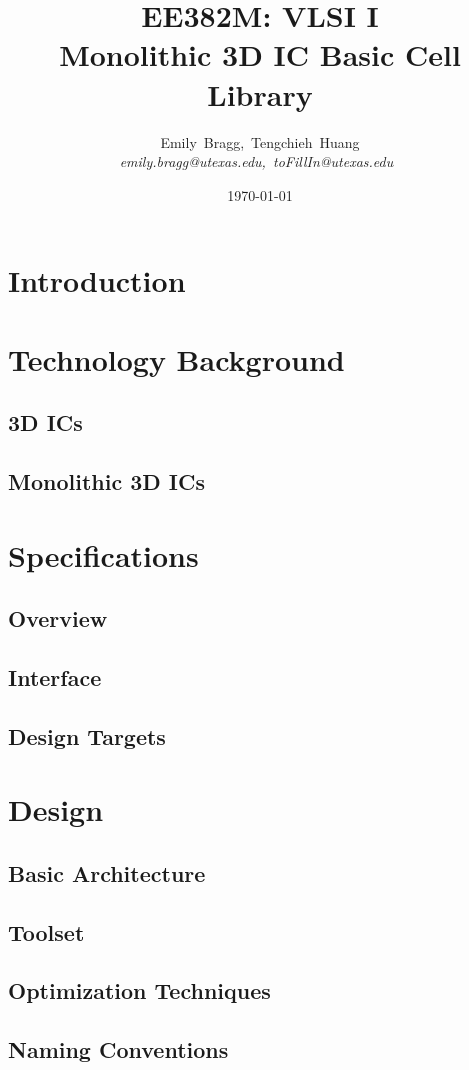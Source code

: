 \documentclass{article}
\title{EE382M: VLSI I \\ Monolithic 3D IC Basic Cell Library}
\author {
	Emily~Bragg,~Tengchieh~Huang\\
       	\em emily.bragg@utexas.edu,~toFillIn@utexas.edu\
}
\date{\today}
\begin{document}
\maketitle


\newpage
\section{Introduction}

\section{Technology Background}
\subsection{3D ICs}
\subsection{Monolithic 3D ICs}

\section{Specifications}
\subsection{Overview}
\subsection{Interface}
\subsection{Design Targets}

\section{Design}
\subsection{Basic Architecture}
\subsection{Toolset}
\subsection{Optimization Techniques}
\subsection{Naming Conventions}
\end{document}
